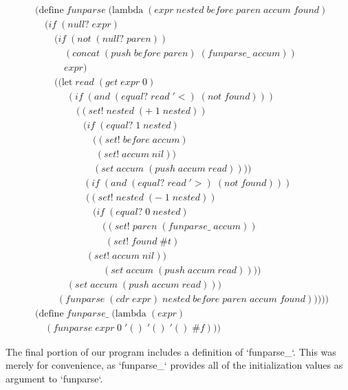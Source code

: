 \clearpage
\begin{align*}
& (\text{define} \; funparse \; (\text{lambda} \; (expr \; nested \; before \; paren \; accum \; found) \; 
\\& \quad (if \; (null? \; expr)
\\& \qquad (if \; (not \; (null? \; paren))
\\& \qquad \quad (concat \; (push \; before \; paren) \; (funparse\_ \; accum))
\\& \qquad \quad expr)
\\& \qquad ((\text{let} \; read \; (get \; expr \; 0)
\\& \qquad \quad \; (if \; (and \; (equal? \; read \; '<) \; (not \; found)))
\\& \qquad \qquad \; ((set! \; nested \; (+ \; 1 \; nested))
\\& \qquad \qquad \quad (if \; (equal? \; 1 \; nested)
\\& \qquad \qquad \qquad ((set! \; before \; accum)
\\& \qquad \qquad \qquad \; (set! \; accum \; nil))
\\& \qquad \qquad \qquad (set \; accum \; (push \; accum \; read))))
\\& \qquad \qquad \quad (if \; (and \; (equal? \; read \; '>) \; (not \; found)))
\\& \qquad \qquad \quad \; ((set! \; nested \; (- \; 1 \; nested))
\\& \qquad \qquad \qquad (if \; (equal? \; 0 \; nested)
\\& \qquad \qquad \qquad \quad ((set! \; paren \; (funparse\_ \; accum))
\\& \qquad \qquad \qquad \quad \; (set! \; found \; \#t)
\\& \qquad \qquad \quad \; (set! \; accum \; nil))
\\& \qquad \qquad \qquad \quad (set \; accum \; (push \; accum \; read))))
\\& \qquad \quad \; (set \; accum \; (push \; accum \; read)))
\\& \qquad \; (funparse \; (cdr \; expr) \; nested \; before \; paren \; accum \; found)))))
\\& (\text{define} \; funparse\_ \; (\text{lambda} \; (expr)
\\& \quad (funparse \; expr \; 0 \; '() \; '() \; '() \; \#f))) \; 
\end{align*}

The final portion of our program includes a definition of `funparse\_`. This was merely 
for convenience, as `funparse\_` provides all of the initialization values as argument 
to `funparse`.

